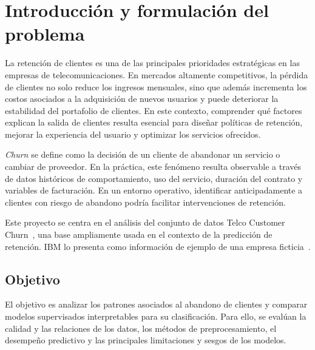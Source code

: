\section{Introducción y formulación del problema}
\label{sec:intro}

La retención de clientes es una de las principales prioridades estratégicas en
las empresas de telecomunicaciones. En mercados altamente competitivos, la pérdida
de clientes no solo reduce los ingresos mensuales, sino que además incrementa los
costos asociados a la adquisición de nuevos usuarios y puede deteriorar la estabilidad
del portafolio de clientes. En este contexto, comprender qué factores explican la salida
de clientes resulta esencial para diseñar políticas de retención, mejorar la experiencia
del usuario y optimizar los servicios ofrecidos.

\emph{Churn} se define como la decisión de un cliente de abandonar un servicio o cambiar
de proveedor. En la práctica, este fenómeno resulta observable a través de datos históricos
de comportamiento, uso del servicio, duración del contrato y variables de facturación.
En un entorno operativo, identificar anticipadamente a clientes con riesgo de abandono podría facilitar intervenciones de retención.

Este proyecto se centra en el análisis del conjunto de datos Telco Customer Churn~\cite{dataset},
una base ampliamente usada en el contexto de la predicción de retención. IBM lo presenta
como información de ejemplo de una empresa ficticia~\cite{ibm}.

\subsection{Objetivo}
El objetivo es analizar los patrones asociados al abandono de clientes y comparar modelos supervisados
interpretables para su clasificación. Para ello, se evalúan la calidad y las relaciones de los datos,
los métodos de preprocesamiento, el desempeño predictivo y las principales limitaciones y sesgos
de los modelos.

